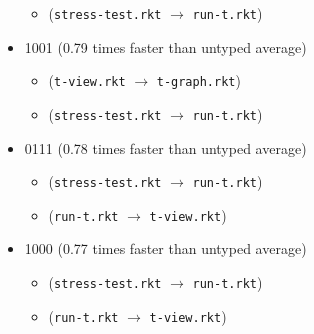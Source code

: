 \documentclass{article}
\newcommand{\mono}[1]{\texttt{#1}}
\begin{document}
\begin{itemize}
\begin{itemize}
  \item (\mono{stress-test.rkt} $\rightarrow$ \mono{run-t.rkt})
  \end{itemize}
\item 1001 (0.79 times faster than untyped average)
  \begin{itemize}
  \item (\mono{t-view.rkt} $\rightarrow$ \mono{t-graph.rkt})
  \item (\mono{stress-test.rkt} $\rightarrow$ \mono{run-t.rkt})
  \end{itemize}
\item 0111 (0.78 times faster than untyped average)
  \begin{itemize}
  \item (\mono{stress-test.rkt} $\rightarrow$ \mono{run-t.rkt})
  \item (\mono{run-t.rkt} $\rightarrow$ \mono{t-view.rkt})
  \end{itemize}
\item 1000 (0.77 times faster than untyped average)
  \begin{itemize}
  \item (\mono{stress-test.rkt} $\rightarrow$ \mono{run-t.rkt})
  \item (\mono{run-t.rkt} $\rightarrow$ \mono{t-view.rkt})
  \end{itemize}


\end{itemize}
\end{document}
